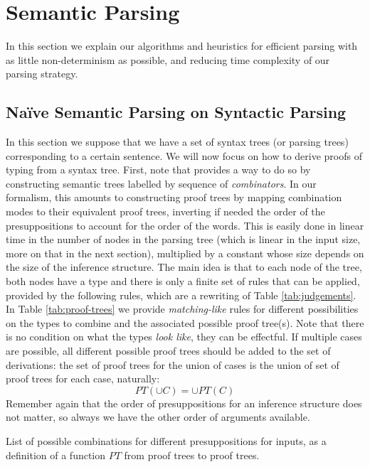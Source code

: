 \section{Semantic Parsing}
\label{sec:parsing}
In this section we explain our algorithms and heuristics for efficient parsing with as little non-determinism as possible, and reducing time complexity of our parsing strategy.

\subsection{Naïve Semantic Parsing on Syntactic Parsing}
In this section we suppose that we have a set of syntax trees (or parsing trees) corresponding to a certain
sentence.
We will now focus on how to derive proofs of typing from a syntax tree.
First, note that \cite{bumfordEffectdrivenInterpretationFunctors2025} provides a way to do so by constructing
semantic trees labelled by sequence of \emph{combinators}.
In our formalism, this amounts to constructing proof trees by mapping combination modes to their equivalent proof
trees, inverting if needed the order of the presuppositions to account for the order of the words.
This is easily done in linear time in the number of nodes in the parsing tree (which is linear in the input size,
more on that in the next section), multiplied by a constant whose size depends on the size of the inference
structure.
The main idea is that to each node of the tree, both nodes have a type and there is only a finite set of rules
that can be applied, provided by the following rules, which are a rewriting of Table \ref{tab:judgements}.
In Table \ref{tab:proof-trees} we provide \emph{matching-like} rules for different possibilities on the types to
combine and the associated possible proof tree(s).
Note that there is no condition on what the types \emph{look like}, they can be effectful.
If multiple cases are possible, all different possible proof trees should be added to the set of derivations: the
set of proof trees for the union of cases is the union of set of proof trees for each case, naturally:
\begin{equation*}
	PT\left( \cup C \right) = \cup PT(C)
\end{equation*}
Remember again that the order of presuppositions for an inference structure does not matter, so always we have the
other order of arguments available.

\begin{table}
	\centering
	\caption{List of possible combinations for different presuppositions for inputs, as a definition of a function
		$PT$ from proof trees to proof trees.}
	\label{tab:proof-trees}
\end{table}


